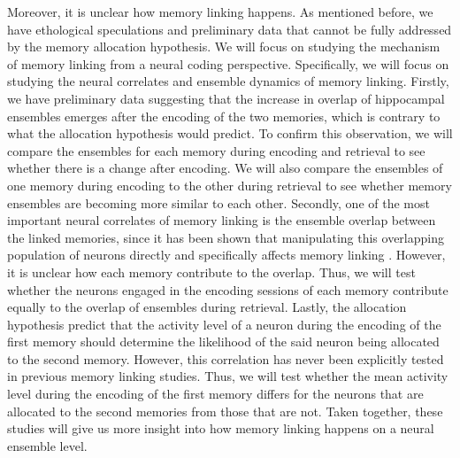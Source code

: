 \documentclass[master.tex]{subfiles}
\begin{document}
Moreover, it is unclear how memory linking happens. As mentioned before, we
have ethological speculations and preliminary data that cannot be fully
addressed by the memory allocation hypothesis. We will focus on studying the
mechanism of memory linking from a neural coding perspective. Specifically, we
will focus on studying the neural correlates and ensemble dynamics of memory
linking. Firstly, we have preliminary data suggesting that the increase in
overlap of hippocampal ensembles emerges after the encoding of the two memories, which is
contrary to what the allocation hypothesis would predict. To confirm this
observation, we will compare the ensembles for each memory during encoding and
retrieval to see whether there is a change after encoding. We will also compare
the ensembles of one memory during encoding to the other during retrieval to see
whether memory ensembles are becoming more similar to each other. Secondly, one of
the most important neural correlates of memory linking is the ensemble overlap
between the linked memories, since it has been shown that manipulating this
overlapping population of neurons directly and specifically affects memory
linking \cite{yokose_overlapping_2017}. However, it is unclear how each memory
contribute to the overlap. Thus, we will test whether the neurons engaged in the
encoding sessions of each memory contribute equally to the overlap of ensembles
during retrieval. Lastly, the allocation hypothesis predict that the activity
level of a neuron during the encoding of the first memory should determine the
likelihood of the said neuron being allocated to the second memory. However,
this correlation has never been explicitly tested in previous memory linking
studies. Thus, we will test whether the mean activity level during the encoding
of the first memory differs for the neurons that are allocated to the second
memories from those that are not. Taken together, these studies will give us
more insight into how memory linking happens on a neural ensemble level.
\end{document}
